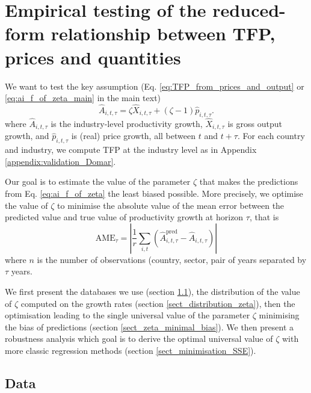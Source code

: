 \section{Empirical testing of the reduced-form relationship between TFP, prices and quantities}
\label{appendix:validation_zeta}

We want to test the key assumption (Eq. \ref{eq:TFP_from_prices_and_output} or \ref{eq:ai_f_of_zeta_main} in the main text)
\begin{equation}
\hat{A}_{i,t,\tau}=\zeta\hat{X}_{i,t,\tau}+(\zeta-1)\hat{p}_{i,t,\tau}.
\label{eq:ai_f_of_zeta}
\end{equation}
where $\hat{A}_{i,t,\tau}$ is the industry-level productivity growth, $\hat{X}_{i,t,\tau}$ is gross output growth,  and $\hat{p}_{i,t,\tau}$ is (real) price growth, all between $t$ and $t+\tau$. For each country and industry, we compute TFP at the industry level as in Appendix \ref{appendix:validation_Domar}.

Our goal is to estimate the value of the parameter $\zeta$ that makes the predictions from Eq. \ref{eq:ai_f_of_zeta} the least biased possible. More precisely, we optimise the value of $\zeta$ to minimise the absolute value of the mean error between the predicted value and true value of productivity growth at horizon $\tau$, that is
\begin{equation}
\label{eq_mean_error_t_t+tau}
    \text{AME}_{\tau}=\left|\frac{1}{r}\sum_{i,t}(\hat{A}^{\text{pred}}_{i,t,\tau}-\hat{A}_{i,t,\tau})\right|
\end{equation}
where $n$ is the number of observations (country, sector, pair of years separated by $\tau$ years.

We first present the databases we use (section \ref{sect_zeta_data}), the distribution of the value of $\zeta$ computed on the growth rates (section \ref{sect_distribution_zeta}), then the optimisation leading to the single universal value of the parameter $\zeta$ minimising the bias of predictions (section \ref{sect_zeta_minimal_bias}).
We then present a robustness analysis which goal is to derive the optimal universal value of $\zeta$ with more classic regression methods (section \ref{sect_minimisation_SSE}).

\subsection{Data}
\label{sect_zeta_data}

